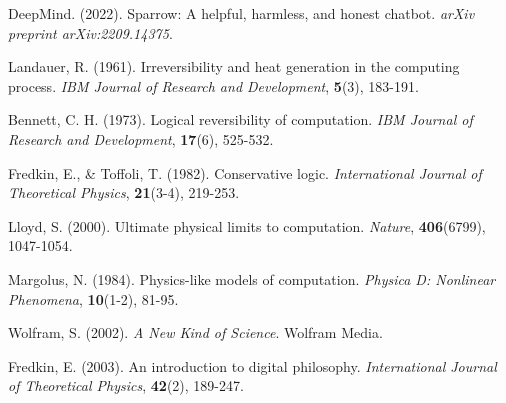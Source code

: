 \documentclass[12pt,a4paper]{article}
\begin{document}
\begin{thebibliography}{99}
DeepMind. (2022). Sparrow: A helpful, harmless, and honest chatbot. \textit{arXiv preprint arXiv:2209.14375}.

Landauer, R. (1961). Irreversibility and heat generation in the computing process. \textit{IBM Journal of Research and Development}, \textbf{5}(3), 183-191.

Bennett, C. H. (1973). Logical reversibility of computation. \textit{IBM Journal of Research and Development}, \textbf{17}(6), 525-532.

Fredkin, E., \& Toffoli, T. (1982). Conservative logic. \textit{International Journal of Theoretical Physics}, \textbf{21}(3-4), 219-253.

Lloyd, S. (2000). Ultimate physical limits to computation. \textit{Nature}, \textbf{406}(6799), 1047-1054.

Margolus, N. (1984). Physics-like models of computation. \textit{Physica D: Nonlinear Phenomena}, \textbf{10}(1-2), 81-95.

Wolfram, S. (2002). \textit{A New Kind of Science}. Wolfram Media.

Fredkin, E. (2003). An introduction to digital philosophy. \textit{International Journal of Theoretical Physics}, \textbf{42}(2), 189-247.

\end{thebibliography}
\end{document}
